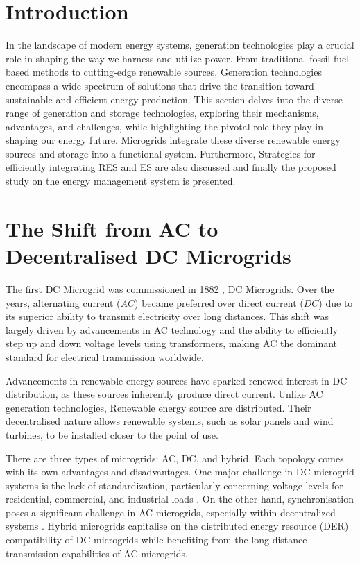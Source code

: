 \section{Introduction}
In the landscape of modern energy systems, generation technologies play a crucial role in shaping the way we harness and utilize power. From traditional fossil fuel-based methods to cutting-edge renewable sources, Generation technologies encompass a wide spectrum of solutions that drive the transition toward sustainable and efficient energy production. This section delves into the diverse range of generation and storage technologies, exploring their mechanisms, advantages, and challenges, while highlighting the pivotal role they play in shaping our energy future. Microgrids integrate these diverse renewable energy sources and storage into a functional system. Furthermore, Strategies for efficiently integrating RES and ES are also discussed and finally the proposed study on the energy management system is presented.
\section{The Shift from AC to Decentralised DC Microgrids}
The first DC Microgrid was commissioned in 1882 \cite{Sulzberger2013}, DC Microgrids. Over the years, alternating current ($AC$) became preferred over direct current ($DC$) due to its superior ability to transmit electricity over long distances. This shift was largely driven by advancements in AC technology and the ability to efficiently step up and down voltage levels using transformers, making AC the dominant standard for electrical transmission worldwide.\par
Advancements in renewable energy sources have sparked renewed interest in DC distribution, as these sources inherently produce direct current. Unlike AC generation technologies, Renewable energy source are distributed. Their decentralised nature allows renewable systems, such as solar panels and wind turbines, to be installed closer to the point of use.\par
There are three types of microgrids: AC, DC, and hybrid. Each topology comes with its own advantages and disadvantages. One major challenge in DC microgrid systems is the lack of standardization, particularly concerning voltage levels for residential, commercial, and industrial loads \cite{Rajesh2017}. On the other hand, synchronisation poses a significant challenge in AC microgrids, especially within decentralized systems \cite{Tapan2018}. Hybrid microgrids capitalise on the distributed energy resource (DER) compatibility of DC microgrids while benefiting from the long-distance transmission capabilities of AC microgrids.
